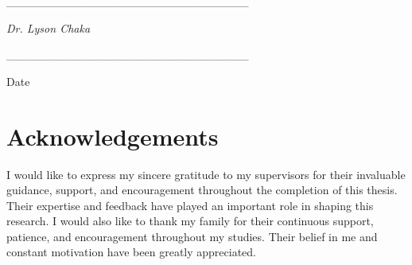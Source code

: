 \documentclass[english]{article}
\begin{document}
\_\_\_\_\_\_\_\_\_\_\_\_\_\_\_\_\_\_\_\_\_\_\_\_\_\_\_\_\_

\emph{Dr. Lyson Chaka}

\vspace{1cm}

\_\_\_\_\_\_\_\_\_\_\_\_\_\_\_\_\_\_\_\_\_\_\_\_\_\_\_\_\_

Date

\newpage{}

\section*{Acknowledgements}

I would like to express my sincere gratitude to my supervisors for their invaluable guidance, support, and encouragement throughout the completion of this thesis. Their expertise and feedback have played an important role in shaping this research. I would also like to thank my family for their continuous support, patience, and encouragement throughout my studies. Their belief in me and constant motivation have been greatly appreciated.

\newpage{}

\tableofcontents{}

\listoffigures

\listoftables

\newpage{}







\label{body-end}

\newpage
{}
{}



\newpage
\appendix

\end{document}
